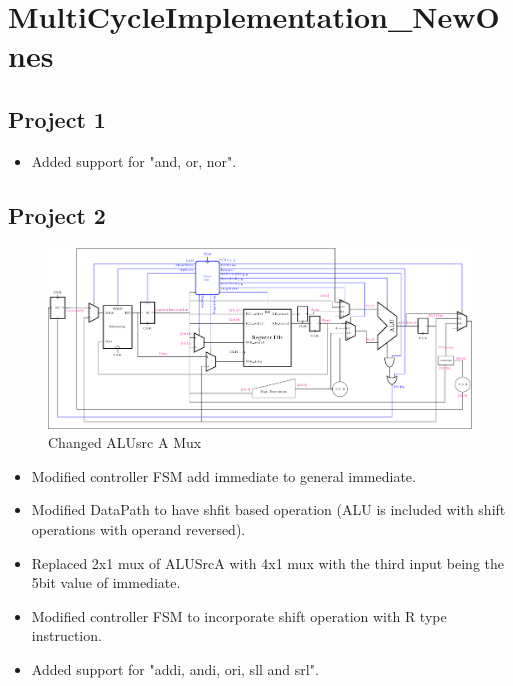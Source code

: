 \documentclass{article}
\begin{document}
\section*{MultiCycleImplementation\_NewOnes}
\subsection*{Project 1}

\begin{itemize}
    \item Added support for "and, or, nor".
\end{itemize}

\subsection*{Project 2}
\begin{figure}[H]
    \begin{center}
        \includegraphics[scale=0.7]{MultiCycleImplementation_NewOnes/TexFiles/MultiCylcle_NewOnes2.pdf}
        \caption*{Changed ALUsrc A Mux}
    \end{center}
\end{figure}
\begin{itemize}
    \item Modified controller FSM add immediate to general immediate.
    \item Modified DataPath to have shfit based operation (ALU is included with shift operations with operand reversed).
    \item Replaced 2x1 mux of ALUSrcA with 4x1 mux with the third input being the 5bit value of immediate.
    \item Modified controller FSM to incorporate shift operation with R type instruction.
    \item Added support for "addi, andi, ori, sll and srl".
\end{itemize}
\end{document}
